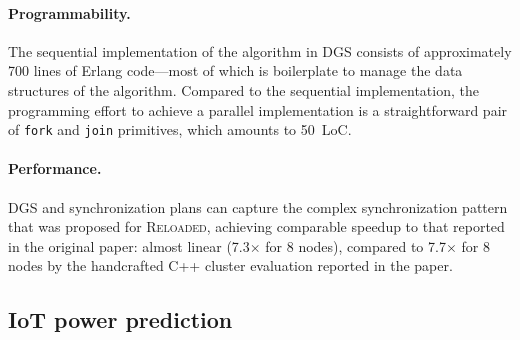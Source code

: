 \paragraph{Programmability.}
The sequential implementation of the algorithm in DGS consists of approximately 700
lines of Erlang code---most of which is boilerplate to manage the
data structures of the algorithm.
Compared to the sequential implementation, the programming effort to achieve a
parallel implementation is a straightforward pair of \texttt{fork} and \texttt{join} primitives, which amounts to 50~LoC.

\paragraph{Performance.}
DGS and synchronization plans can capture the complex synchronization pattern that was proposed for \textsc{Reloaded}, achieving comparable speedup to that reported in the original paper:
almost linear (7.3$\times$ for 8 nodes), compared to 7.7$\times$ for 8 nodes by the handcrafted C++ cluster evaluation reported in the paper.

\subsection{IoT power prediction}
\label{dgs:ssec:iot-case-study}

